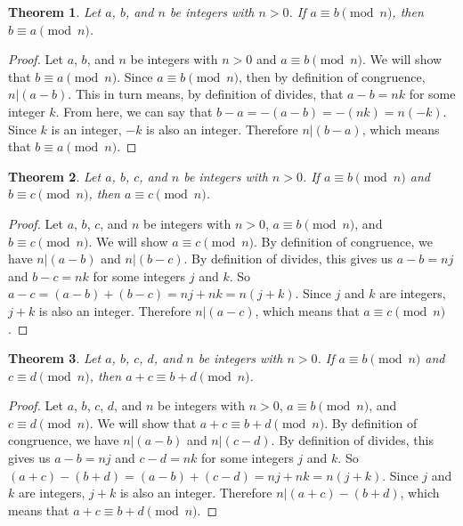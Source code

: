 \documentclass[12pt,leqno]{article}
\numberwithin{equation}{section}
\newtheorem{thm}{Theorem}[section]
\theoremstyle{definition}
\begin{document}
\begin{thm}
Let $a$, $b$, and $n$ be integers with $n > 0$. If $a \equiv b
\pmod{n}$, then ${b \equiv a \pmod{n}}$.
\end{thm}
\begin{proof}[Proof]
Let $a$, $b$, and $n$ be integers with $n > 0$ and $a \equiv b
\pmod{n}$.  We will show that ${b \equiv a \pmod{n}}$.  Since $a \equiv b
\pmod{n}$, then by definition of congruence, $n|(a - b)$.  This in turn means, by definition of divides, that $a - b = nk$ for some integer $k$.  From here, we can say that $b - a = -(a - b) = -(nk) = n(-k)$.  Since $k$ is an integer, $-k$ is also an integer.  Therefore $n|(b - a)$, which means that ${b \equiv a \pmod{n}}$.
\end{proof}

\begin{thm}
Let $a$, $b$, $c$, and $n$ be integers with $n > 0$. If $a \equiv b
\pmod{n}$ and ${b \equiv c \pmod{n}}$, then $a \equiv c \pmod{n}$.
\end{thm}

\begin{proof}[Proof]
Let $a$, $b$, $c$, and $n$ be integers with $n > 0$, $a \equiv b
\pmod{n}$, and ${b \equiv c \pmod{n}}$. We will show $a \equiv c \pmod{n}$.  By definition of congruence, we have $n|(a - b)$ and $n|(b - c)$.  By definition of divides, this gives us $a - b = nj$ and $b - c = nk$ for some integers $j$ and $k$.  So $a - c = (a - b) + (b - c) = nj + nk = n(j + k)$.  Since $j$ and $k$ are integers, $j + k$ is also an integer.  Therefore $n|(a - c)$, which means that $a \equiv c \pmod{n}$.
\end{proof}

\begin{thm}
Let $a$, $b$, $c$, $d$, and $n$ be integers with $n > 0$. If $a
\equiv b \pmod{n}$ and~${c \equiv d \pmod{n}}$, then $a + c \equiv b
+ d \pmod{n}$.
\end{thm}

\begin{proof}[Proof]
Let $a$, $b$, $c$, $d$, and $n$ be integers with $n > 0$, $a
\equiv b \pmod{n}$, and ${c \equiv d \pmod{n}}$. We will show that $a + c \equiv b + d \pmod{n}$.  By definition of congruence, we have $n|(a - b)$ and $n|(c - d)$.  By definition of divides, this gives us $a - b = nj$ and $c - d = nk$ for some integers $j$ and $k$.  So $(a + c) - (b + d) = (a - b) + (c - d) = nj + nk = n(j + k)$.  Since $j$ and $k$ are integers, $j + k$ is also an integer.  Therefore $n|(a + c) - (b + d)$, which means that $a + c \equiv b + d \pmod{n}$.
\end{proof}
\end{document}
